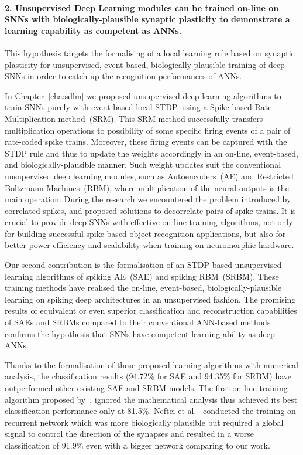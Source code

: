 \paragraph{2. Unsupervised Deep Learning modules can be trained on-line on SNNs with biologically-plausible synaptic plasticity to demonstrate a learning capability as competent as ANNs.}
This hypothesis targets the formalising of a local learning rule based on synaptic plasticity for unsupervised, event-based, biologically-plausible training of deep SNNs in order to catch up the recognition performances of ANNs.

In Chapter~\ref{cha:sdlm} we proposed unsupervised deep learning algorithms to train SNNs purely with event-based local STDP, using a Spike-based Rate Multiplication method~(SRM).
This SRM method successfully transfers multiplication operations to possibility of some specific firing events of a pair of rate-coded spike trains.
Moreover, these firing events can be captured with the STDP rule and thus to update the weights accordingly in an on-line, event-based, and biologically-plausible manner.
Such weight updates suit the conventional unsupervised deep learning modules, such as Autoencoders~(AE) and Restricted Boltzmann Machines~(RBM), where multiplication of the neural outputs is the main operation.
During the research we encountered the problem introduced by correlated spikes, and proposed solutions to decorrelate pairs of spike trains.
It is crucial to provide deep SNNs with effective on-line training algorithms, not only for building successful spike-based object recognition applications, but also for better power efficiency and scalability when training on neuromorphic hardware.

Our second contribution is the formalisation of an STDP-based unsupervised learning algorithms of spiking AE~(SAE) and spiking RBM~(SRBM).
These training methods have realised the on-line, event-based, biologically-plausible learning on spiking deep architectures in an unsupervised fashion.
The promising results of equivalent or even superior classification and reconstruction capabilities of SAEs and SRBMs compared to their conventional ANN-based methods confirms the hypothesis that SNNs have competent learning ability as deep ANNs.

Thanks to the formalisation of these proposed learning algorithms with numerical analysis, the classification results (94.72\% for SAE and 94.35\% for SRBM) have outperformed other existing SAE and SRBM models.
The first on-line training algorithm proposed by~\citep{neil2013online}, ignored the mathematical analysis thus achieved its best classification performance only at 81.5\%.
Neftci et al.~\citep{neftci2013event} conducted the training on recurrent network which was more biologically plausible but required a global signal to control the direction of the synapses and resulted in a worse classification of 91.9\% even with a bigger network comparing to our work.


